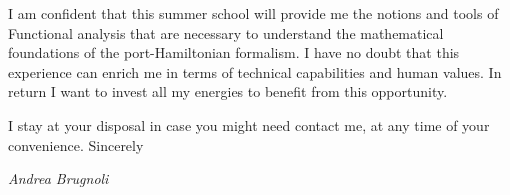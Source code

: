 \documentclass[11pt]{letter}
\begin{document}
I am confident that this summer school will provide me the notions and tools of Functional analysis that are necessary to understand the mathematical foundations of the port-Hamiltonian formalism.  I have no doubt that this experience can enrich me in terms of technical capabilities and human values. In return I want to invest all my energies to benefit from this opportunity.

I stay at your disposal in case you might need contact me, at any time of your convenience.
Sincerely
 \begin{center}
 \large\textit{Andrea Brugnoli}
 \end{center}
 
\end{document}
